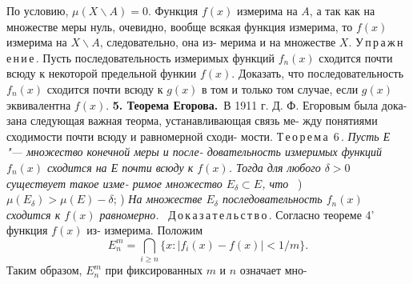 \documentclass[a5paper]{book}
\begin{document}
\linespread{0.8}
\noindent \normalsize По условию, $\mu(X\backslash A)=0$. Функция $f(x)$ измерима на $A$, а так \linebreak
как на множестве меры нуль, очевидно, вообще всякая функция \linebreak 
измерима, то $f(x)$ измерима на $X\backslash A$, следовательно, она из- \linebreak
мерима и на множестве $X$.\newline 
\footnotesize \indent У\,п\,р\,а\,ж\,н\,е\,н\,и\,е\,. Пусть последовательность измеримых функций $f_{n}(x)$ \linebreak
сходится почти всюду к некоторой предельной функии $f(x)$. Доказать, что \linebreak
последовательность $f_{n}(x)$ сходится почти всюду к $g(x)$ в том и только том \linebreak 
случае, если $g(x)$ эквивалентна $f(x)$. \newline 
\normalsize \indent \textbf{5. Теорема Егорова.}\ В 1911 г. Д. Ф. Егоровым была дока- \linebreak
зана следующая важная теорма, устанавливающая связь ме- \linebreak 
жду понятиями сходимости почти всюду и равномерной сходи- \linebreak 
мости.\newline
\indent Т\,е\,о\,р\,е\,м\,а\, 6\,. \textit{Пусть Е "--- множество конечной меры и после- \linebreak
довательность измеримых функций $f_{n}(x)$ сходится на Е почти \linebreak 
всюду к $f(x)$. Тогда для любого $\delta>0$ существует такое изме- \linebreak 
римое множество $E_{\delta}\subset E$, что}\ \newline
{}) $\mu(E_{\delta})>\mu(E)-\delta$; \newline
{}) \textit{На множестве $E_{\delta}$ последовательность $f_{n}(x)$ сходится к \linebreak 
$f(x)$ равномерно.}\ \newline 
\indent Д\,о\,к\,а\,з\,а\,т\,е\,л\,ь\,с\,т\,в\,о\,. Согласно теореме 4' функция $f(x)$ из- \linebreak 
измерима. Положим  
\begin{equation*} E^m_{n}=\bigcap_{i\geqslant n} \lbrace x:|f_{i}(x)-f(x)|<1/m\rbrace.\end{equation*}
Таким образом, $E^m_{n}$ при фиксированных $m$ и $n$ означает мно- \linebreak 
\end{document}
